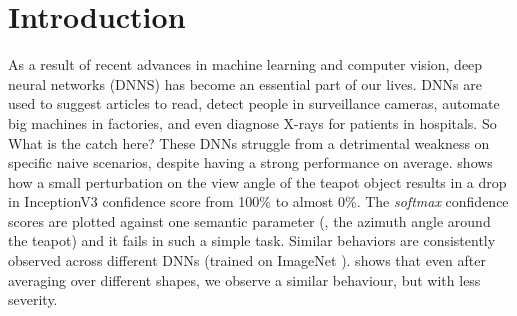 \section{Introduction} \label{sec:intro}
As a result of recent advances in machine learning and computer vision, deep neural networks (DNNS) has become an essential part of our lives. DNNs are used to suggest articles to read, detect people in surveillance cameras, automate big machines in factories, and even diagnose X-rays for patients in hospitals. So What is the catch here? These DNNs struggle from a detrimental weakness on specific naive scenarios, despite having a strong performance on average. \figLabel{\ref{fig:intro_fig}} shows how a small perturbation on the view angle of the teapot object results in a drop in InceptionV3 \cite{inception} confidence score from 100\% to almost 0\%. The \emph{softmax} confidence scores are plotted against one semantic parameter (\ie, the azimuth angle around the teapot) and it fails in such a simple task. Similar behaviors are consistently observed across different DNNs (trained on ImageNet \cite{IMAGENET}). \figLabel{\ref{fig:global}} shows that even after averaging over different shapes, we observe a similar behaviour, but with less severity.

